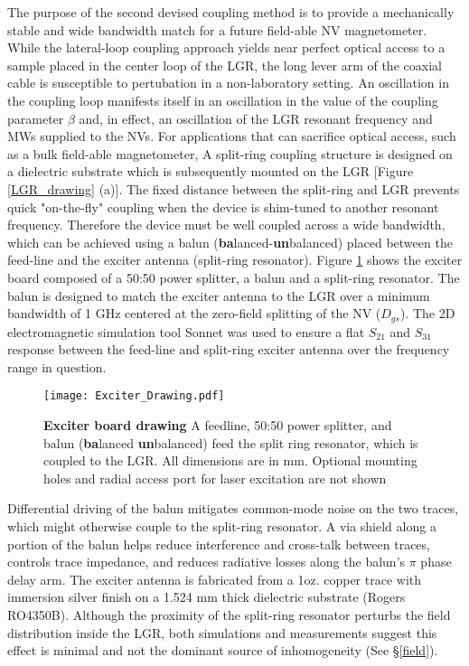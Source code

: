 The purpose of the second devised coupling method is to provide a mechanically stable and wide bandwidth match for a future field-able NV magnetometer. While the lateral-loop coupling approach yields near perfect optical access to a sample placed in the center loop of the LGR, the long lever arm of the coaxial cable is susceptible to pertubation in a non-laboratory setting. An oscillation in the coupling loop manifests itself in an oscillation in the value of the coupling parameter $\beta$ and, in effect, an oscillation of the LGR resonant frequency and MWs supplied to the NVs. For applications that can sacrifice optical access, such as a bulk field-able magnetometer, A split-ring coupling structure is designed on a dielectric substrate which is subsequently mounted on the LGR [Figure \ref{LGR_drawing} (a)]. The fixed distance between the split-ring and LGR prevents quick "on-the-fly" coupling when the device is shim-tuned to another resonant frequency. Therefore the device must be well coupled across a wide bandwidth, which can be achieved using a balun (\textbf{ba}lanced-\textbf{un}balanced) placed between the feed-line and the exciter antenna (split-ring resonator). Figure \ref{LGR_Exciter} shows the exciter board composed of a 50:50 power splitter, a balun and a split-ring resonator. The balun is designed to match the exciter antenna to the LGR over a minimum bandwidth of 1 GHz centered at the zero-field splitting of the NV ($D_{gs}$). The 2D electromagnetic simulation tool Sonnet was used to ensure a flat $S_{21}$ and $S_{31}$ response between the feed-line and split-ring exciter antenna over the frequency range in question. 

\begin{figure}[t!]
\centering
\texttt{[image: Exciter\_Drawing.pdf]}  
\caption{\textbf{Exciter board drawing} A feedline, 50:50 power splitter, and balun (\textbf{ba}lanced \textbf{un}balanced) feed the split ring resonator, which is coupled to the LGR. All dimensions are in mm. Optional mounting holes and radial access port for laser excitation are not shown}
\label{LGR_Exciter}
\end{figure}

Differential driving of the balun mitigates common-mode noise on the two traces, which might otherwise couple to the split-ring resonator. A via shield along a portion of the balun helps reduce interference and cross-talk between traces, controls trace impedance, and reduces radiative losses along the balun's $\pi$ phase delay arm. The exciter antenna is fabricated from a 1oz. copper trace with immersion silver finish on a 1.524 mm thick dielectric substrate (Rogers RO4350B). Although the proximity of the split-ring resonator perturbs the field distribution inside the LGR, both simulations and measurements suggest this effect is minimal and not the dominant source of inhomogeneity (See \S \ref{field}).  

